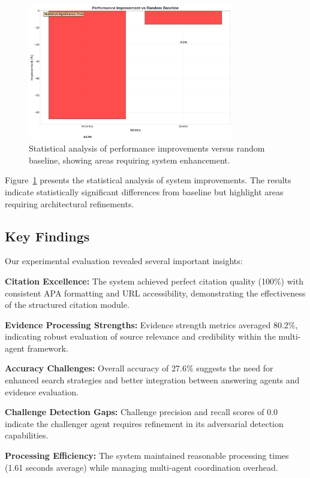 \documentclass{article}
\begin{document}
\begin{figure}[htbp]
\centering
\includegraphics[width=0.8\textwidth]{figures/improvement_analysis.png}
\caption{Statistical analysis of performance improvements versus random baseline, showing areas requiring system enhancement.}
\label{fig:improvement_analysis}
\end{figure}

Figure~\ref{fig:improvement_analysis} presents the statistical analysis of system improvements. The results indicate statistically significant differences from baseline but highlight areas requiring architectural refinements.

\subsection{Key Findings}

Our experimental evaluation revealed several important insights:

\textbf{Citation Excellence:} The system achieved perfect citation quality (100\%) with consistent APA formatting and URL accessibility, demonstrating the effectiveness of the structured citation module.

\textbf{Evidence Processing Strengths:} Evidence strength metrics averaged 80.2\%, indicating robust evaluation of source relevance and credibility within the multi-agent framework.

\textbf{Accuracy Challenges:} Overall accuracy of 27.6\% suggests the need for enhanced search strategies and better integration between answering agents and evidence evaluation.

\textbf{Challenge Detection Gaps:} Challenge precision and recall scores of 0.0 indicate the challenger agent requires refinement in its adversarial detection capabilities.

\textbf{Processing Efficiency:} The system maintained reasonable processing times (1.61 seconds average) while managing multi-agent coordination overhead.
\end{document}
